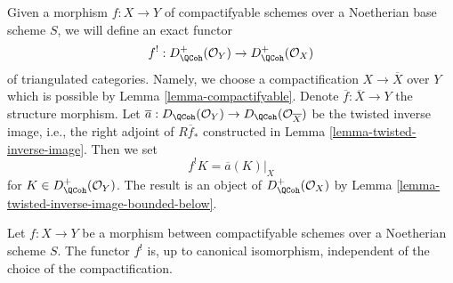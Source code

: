 \medskip\noindent
Given a morphism $f : X \to Y$ of compactifyable schemes over a Noetherian
base scheme $S$, we will define an exact functor
$$
f^! : D_\QCoh^+(\mathcal{O}_Y) \to D_\QCoh^+(\mathcal{O}_X)
$$
of triangulated categories. Namely, we choose a compactification
$X \to \overline{X}$ over $Y$ which is possible by
Lemma \ref{lemma-compactifyable}. Denote $\overline{f} : \overline{X} \to Y$
the structure morphism. Let
$\overline{a} : D_\QCoh(\mathcal{O}_Y) \to D_\QCoh(\mathcal{O}_{\overline{X}})$
be the twisted inverse image, i.e., the right adjoint of $R\overline{f}_*$
constructed in Lemma \ref{lemma-twisted-inverse-image}. Then we set
$$
f^!K  = \overline{a}(K)|_X
$$
for $K \in D_\QCoh^+(\mathcal{O}_Y)$. The result is an object of
$D_\QCoh^+(\mathcal{O}_X)$ by
Lemma \ref{lemma-twisted-inverse-image-bounded-below}.

\begin{lemma}
\label{lemma-shriek-well-defined}
Let $f : X \to Y$ be a morphism between compactifyable schemes over a
Noetherian scheme $S$. The functor $f^!$ is, up to canonical isomorphism,
independent of the choice of the compactification.
\end{lemma}

